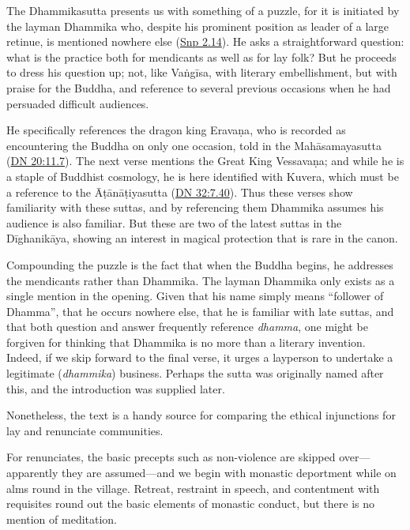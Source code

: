 \documentclass[12pt,openany]{book}%
\begin{document}
The Dhammikasutta presents us with something of a puzzle, for it is initiated by the layman Dhammika who, despite his prominent position as leader of a large retinue, is mentioned nowhere else (\href{https://suttacentral.net/snp2.14/en/sujato}{Snp 2.14}). He asks a straightforward question: what is the practice both for mendicants as well as for lay folk? But he proceeds to dress his question up; not, like \textsanskrit{Vaṅgīsa}, with literary embellishment, but with praise for the Buddha, and reference to several previous occasions when he had persuaded difficult audiences.

He specifically references the dragon king \textsanskrit{Eravaṇa}, who is recorded as encountering the Buddha on only one occasion, told in the \textsanskrit{Mahāsamayasutta} (\href{https://suttacentral.net/dn20/en/sujato\#11.7}{DN 20:11.7}). The next verse mentions the Great King \textsanskrit{Vessavaṇa}; and while he is a staple of Buddhist cosmology, he is here identified with Kuvera, which must be a reference to the \textsanskrit{Āṭānāṭiyasutta} (\href{https://suttacentral.net/dn32/en/sujato\#7.40}{DN 32:7.40}). Thus these verses show familiarity with these suttas, and by referencing them Dhammika assumes his audience is also familiar. But these are two of the latest suttas in the \textsanskrit{Dīghanikāya}, showing an interest in magical protection that is rare in the canon.

Compounding the puzzle is the fact that when the Buddha begins, he addresses the mendicants rather than Dhammika. The layman Dhammika only exists as a single mention in the opening. Given that his name simply means “follower of Dhamma”, that he occurs nowhere else, that he is familiar with late suttas, and that both question and answer frequently reference \textit{dhamma}, one might be forgiven for thinking that Dhammika is no more than a literary invention. Indeed, if we skip forward to the final verse, it urges a layperson to undertake a legitimate (\textit{dhammika}) business. Perhaps the sutta was originally named after this, and the introduction was supplied later.

Nonetheless, the text is a handy source for comparing the ethical injunctions for lay and renunciate communities.

For renunciates, the basic precepts such as non-violence are skipped over—apparently they are assumed—and we begin with monastic deportment while on alms round in the village. Retreat, restraint in speech, and contentment with requisites round out the basic elements of monastic conduct, but there is no mention of meditation.
\end{document}
